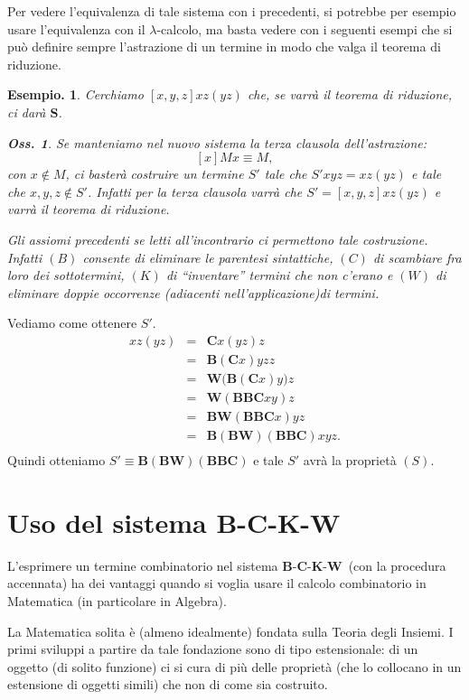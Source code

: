 \documentclass{book}
\newtheorem{osservazione}{Oss.}[chapter]
\newtheorem{esempio}{Esempio.}
\newcommand*{\KK}{$\mathbf{K}$}    %
\newcommand*{\SSS}{$\mathbf{S}$}   %
\newcommand*{\CC}{$\mathbf{C}$}    %
\newcommand*{\BB}{$\mathbf{B}$}    %
\newcommand*{\WW}{$\mathbf{W}$}    %
\newcommand*{\cc}{\mathbf{C}}    %
\newcommand*{\bb}{\mathbf{B}}    %
\newcommand*{\ww}{\mathbf{W}}    %
\newcommand*{\lbc}{$\lambda$-cal\-co\-lo}
\begin{document}
Per vedere l'equivalenza di tale sistema con i precedenti, si potrebbe per 
esempio usare l'equivalenza con il \lbc, ma basta vedere con i seguenti esempi 
che si pu\`o definire sempre 
l'astrazione di un termine in modo che valga il teorema di riduzione.

\begin{esempio}
Cerchiamo $[x, y, z]xz(yz)$ che, se varr\`a il teorema di riduzione, ci dar\`a
\SSS. 

\begin{osservazione}Se manteniamo nel nuovo sistema la terza clausola 
dell'astrazione: 
$$[x]Mx \equiv M,$$ con $x \notin M$, ci baster\`a costruire un 
termine $S'$ tale che $S'xyz = xz(yz)$ e tale che $x, y, z \notin S'$. 
Infatti per la terza clausola varr\`a  che $S' = [x, y, z]xz(yz)$ e varr\`a il 
teorema di riduzione.
\end{osservazione}
Gli assiomi precedenti se letti all'incontrario ci permettono tale costruzione.
Infatti $(B)$ consente di eliminare le parentesi sintattiche, $(C)$ di 
scambiare fra loro dei sottotermini, $(K)$ di ``inventare'' termini che non
c'erano e $(W)$ di eliminare doppie occorrenze (adiacenti nell'applicazione)di 
termini.
\end{esempio}
Vediamo come ottenere $S'$.
\[
\begin{array}{lcl}
xz(yz) & = & \cc x(yz)z \\
       & = & \bb (\cc x)yzz \\
       & = & \ww \bigl( \bb (\cc x)y\bigr)z \\
       & = & \ww ( \bb \bb \cc xy)z \\
       & = & \bb \ww (\bb \bb \cc x)yz \\
       & = & \bb (\bb \ww)(\bb \bb \cc)xyz. \\
\end{array}
\]
Quindi otteniamo $S' \equiv \bb (\bb \ww)(\bb \bb \cc)$ e tale $S'$ avr\`a
la propriet\`a $(S)$.

\section{Uso del sistema \BB-\CC-\KK-\WW}
L'esprimere un termine combinatorio nel sistema \BB-\CC-\KK-\WW~(con la 
procedura accennata) ha dei vantaggi quando si voglia usare il calcolo 
combinatorio in Matematica (in particolare in Algebra). 

La Matematica solita \`e (almeno idealmente) fondata sulla Teoria degli 
Insiemi. I primi sviluppi a partire da tale fondazione sono di tipo 
estensionale: di un oggetto (di solito funzione) ci si cura di pi\`u delle
propriet\`a (che lo collocano in un estensione di oggetti simili) che non di 
come sia costruito.
\end{document}
